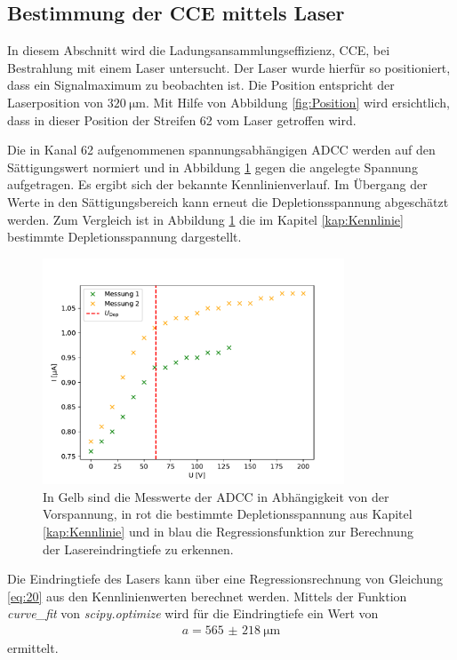 \subsection{Bestimmung der CCE mittels Laser}
\label{kap:CCEL}
In diesem Abschnitt wird die Ladungsansammlungseffizienz, CCE, bei Bestrahlung mit einem Laser untersucht. Der Laser wurde hierfür so positioniert, dass ein Signalmaximum zu beobachten ist. Die Position entspricht der Laserposition von $\SI{320}{\micro\metre}$. Mit Hilfe von Abbildung \ref{fig:Position} wird ersichtlich, dass in dieser Position der Streifen 62 vom Laser getroffen wird.

Die in Kanal 62 aufgenommenen spannungsabhängigen ADCC werden auf den Sättigungswert normiert und in Abbildung \ref{fig:KennlinieLaser} gegen die angelegte Spannung aufgetragen. Es ergibt sich der bekannte Kennlinienverlauf. Im Übergang der Werte in den Sättigungsbereich kann erneut die Depletionsspannung abgeschätzt werden. Zum Vergleich ist in Abbildung \ref{fig:KennlinieLaser} die im Kapitel \ref{kap:Kennlinie} bestimmte Depletionsspannung dargestellt.
\begin{figure}
  \centering
  \includegraphics[width=0.8\textwidth]{plots/Kennlinie.pdf}
  \caption{In Gelb sind die Messwerte der ADCC in Abhängigkeit von der Vorspannung, in rot die bestimmte Depletionsspannung aus Kapitel \ref{kap:Kennlinie} und in blau die Regressionsfunktion zur Berechnung der Lasereindringtiefe zu erkennen.}
  \label{fig:KennlinieLaser}
\end{figure}
\FloatBarrier
Die Eindringtiefe des Lasers kann über eine Regressionsrechnung von Gleichung \eqref{eq:20} aus den Kennlinienwerten berechnet werden. Mittels der Funktion \textit{curve\_fit} von \textit{scipy.optimize} \cite{scipy} wird für die Eindringtiefe ein Wert von
\begin{align*}
   a= \SI{565(218)}{\micro\metre}
\end{align*}
ermittelt.

